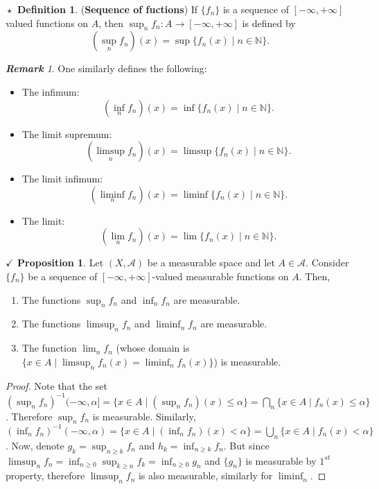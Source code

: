 \documentclass{article}
\theoremstyle{definition}
\newtheorem{definition}{$\boxed{\star}$ Definition}
\theoremstyle{remark}
\newtheorem*{remark}{\textbf{Remark}}
\theoremstyle{definition}
\theoremstyle{definition}
\newtheorem{proposition}{$\checkmark$ Proposition}
\theoremstyle{definition}
\newcommand{\bunion}{\bigcup}
\newcommand{\bintrs}{\bigcap}
\newcommand{\where}{\;\vert\;}
\newcommand{\N}{\mathbb{N}}
\newcommand{\alg}[1]{\mathscr{#1}}
\newcommand{\inv}[1]{{#1}^{-1}}
\begin{document}
\hrulefill
\begin{definition}
	(\textbf{Sequence of fuctions}) If $ \{f_n\} $ is a sequence of $ [-\infty,+\infty] $ valued functions on $ A $, then $ \sup_{n} f_n : A \to [-\infty,+\infty]$ is defined by
	\[\left (\sup_{n} f_n\right )(x) = \sup\{f_n(x)\where n \in \N\}.\]
\end{definition}
\begin{remark}
	One similarly defines the following:
	\begin{itemize}
		\item {The infimum:
	\[\left (\inf_{n} f_n\right )(x) = \inf\{f_n(x)\where n \in \N\}.\]	
	}
\item {The limit supremum:
\[\left (\limsup_{n} f_n\right )(x) = \limsup\{f_n(x)\where n \in \N\}.\]
}
\item {The limit infimum:
\[\left (\liminf_{n} f_n\right )(x) = \liminf\{f_n(x)\where n \in \N\}.\]
}
\item {The limit:
\[\left (\lim_{n} f_n\right )(x) = \lim\{f_n(x)\where n \in \N\}.\]
}
	\end{itemize}
\end{remark}
\hrulefill
\begin{proposition}\label{P-20}
	Let $ (X,\alg{A}) $ be a measurable space and let $ A\in \alg{A} $. Consider $ \{f_n\} $ be a sequence of $ [-\infty,+\infty] $-valued measurable functions on $ A $. Then,
	\begin{enumerate}
		\item {The functions $ \sup_{n}f_n $ and $ \inf_n f_n $ are measurable.}
		\item {The functions $ \limsup_{n}f_n $ and $ \liminf_{n} f_n$ are measurable.}
		\item {The function $ \lim_{n} f_n $ (whose domain is $ \{x\in A \where \limsup_nf_n(x) = \liminf_nf_n(x)\} $) is measurable.}
	\end{enumerate}
\end{proposition}
\begin{proof}
	Note that the set $ \inv{(\sup_{n}f_n)}(-\infty,\alpha] = \{x\in A\where (\sup_n f_n)(x) \le \alpha\} = \bintrs_n \{x\in A \where f_n(x)\le \alpha\}$. Therefore $ \sup_n f_n $ is measurable. Similarly, $ \inv{(\inf_n f_n)}(-\infty,\alpha)  = \{x\in A \where (\inf_nf_n)(x) <\alpha\} = \bunion_n \{x\in A\where f_n(x)<\alpha\}$. Now, denote $ g_k = \sup_{n\ge k}f_n $ and $ h_k = \inf_{n\ge k}f_n $. But since $ \limsup_{n} f_n = \inf_{n\ge 0} \sup_{k\ge n} f_k = \inf_{n\ge 0} g_n$ and $ \{g_n\} $ is measurable by $ 1^{st} $ property, therefore $ \limsup_{n} f_n $ is also measurable, similarly for $ \liminf_{n} $.
\end{proof}
\hrulefill
\newpage
\end{document}
